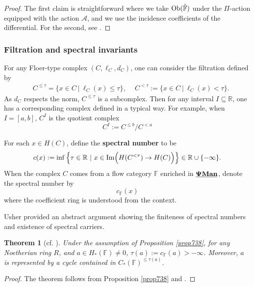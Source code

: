 \documentclass[reqno, 10pt]{amsart}
\numberwithin{equation}{section}
\numberwithin{equation}{section}
\renewcommand{\subset}{\subseteq}
\newtheorem{thm}{Theorem}[section]
\theoremstyle{definition}
\theoremstyle{remark}
\newcommand{\beqn}{\begin{equation*}}
\newcommand{\eeqn}{\end{equation*}}
\newcommand{\mb}{\mathbb}
\newcommand{\mc}{\mathcal}
\newcommand{\pman}{\uds{{\bf \Psi}{\bf Man}}}
\newcommand{\uds}[1]{\underline{\smash{#1}}}
\begin{document}
\begin{proof}
The first claim is straightforward where we take ${\rm Ob}(\mathring{\mb F})$ under the $\Pi$-action equipped with the action ${\mc A}$, and we use the incidence coefficients of the differential. For the second, see \cite[Section 12]{Usher_Zhang_2016}.
\end{proof}



\subsubsection{Filtration and spectral invariants}


For any Floer-type complex $(C, \ell_C, d_C)$, one can consider the filtration defined by 
\begin{align*}
&\ C^{\leq \tau} = \Big\{ x \in C\ |\ \ell_C (x) \leq \tau \Big\},\ &\ C^{<\tau}:= \Big\{ x \in C\ |\ \ell_C(x) < \tau \Big\}.
\end{align*}
As $d_C$ respects the norm, $C^{\leq \tau}$ is a subcomplex.  Then for any interval $I \subset {\mb R}$, one has a corresponding complex defined in a typical way. For example, when $I = [a, b]$, $C^I$ is the quotient complex
\beqn
C^I:= C^{\leq b}/ C^{< a}
\eeqn

For each $x \in H(C)$, define the {\bf spectral number} to be 
\beqn
c(x):= \inf \Big\{ \tau \in {\mb R}\ |\ x \in {\rm Im} \Big( H(C^{<\tau}) \to H(C) \Big) \Big\} \in {\mb R} \cup \{-\infty\}.
\eeqn
When the complex $C$ comes from a flow category ${\mb F}$ enriched in $\pman$, denote the spectral number by 
\beqn
c_{{\mb F}}(x)
\eeqn
where the coefficient ring is understood from the context. 


Usher \cite{Usher_2008} provided an abstract argument showing the finiteness of spectral numbers and existence of spectral carriers.

\begin{thm}[cf. \cite{Usher_2008}]\label{thm_Usher}
Under the assumption of Proposition \ref{prop738}, for any Noetherian ring $R$, and $a \in H_*({\mb F}) \neq 0$, $\tau(a):= c_{\mb F}(a) > -\infty$. Moreover, $a$ is represented by a cycle contained in $C_*({\mb F})^{\leq \tau(a)}$.
\end{thm}

\begin{proof}
The theorem follows from Proposition \ref{prop738} and \cite[Theorem 1.3]{Usher_2008}.
\end{proof}
\end{document}

